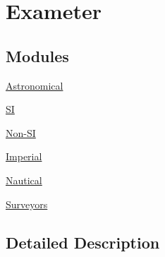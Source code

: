\hypertarget{group___e_g_x_math-_conversions-_length_conversions-_exameter}{}\section{Exameter}
\label{group___e_g_x_math-_conversions-_length_conversions-_exameter}
\subsection*{Modules}
\begin{DoxyCompactItemize}
\item 
\mbox{\hyperlink{group___e_g_x_math-_conversions-_length_conversions-_exameter-_astronomical}{Astronomical}}
\item 
\mbox{\hyperlink{group___e_g_x_math-_conversions-_length_conversions-_exameter-_s_i}{SI}}
\item 
\mbox{\hyperlink{group___e_g_x_math-_conversions-_length_conversions-_exameter-_non-_s_i}{Non-\/\+SI}}
\item 
\mbox{\hyperlink{group___e_g_x_math-_conversions-_length_conversions-_exameter-_imperial}{Imperial}}
\item 
\mbox{\hyperlink{group___e_g_x_math-_conversions-_length_conversions-_exameter-_nautical}{Nautical}}
\item 
\mbox{\hyperlink{group___e_g_x_math-_conversions-_length_conversions-_exameter-_surveyors}{Surveyors}}
\end{DoxyCompactItemize}


\subsection{Detailed Description}
